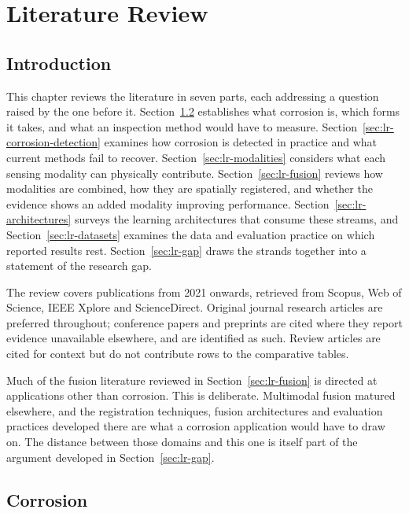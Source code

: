 \chapter[LITERATURE REVIEW]{Literature Review}
\label{ch:literature-review}

\section{Introduction}
\label{sec:lr-introduction}

This chapter reviews the literature in seven parts, each addressing a question
raised by the one before it. Section~\ref{sec:lr-corrosion} establishes what
corrosion is, which forms it takes, and what an inspection method would have to
measure. Section~\ref{sec:lr-corrosion-detection} examines how corrosion is
detected in practice and what current methods fail to recover.
Section~\ref{sec:lr-modalities} considers what each sensing modality can
physically contribute. Section~\ref{sec:lr-fusion} reviews how modalities are
combined, how they are spatially registered, and whether the evidence shows an
added modality improving performance. Section~\ref{sec:lr-architectures} surveys
the learning architectures that consume these streams, and
Section~\ref{sec:lr-datasets} examines the data and evaluation practice on which
reported results rest. Section~\ref{sec:lr-gap} draws the strands together into
a statement of the research gap.

The review covers publications from 2021 onwards, retrieved from Scopus, Web of
Science, IEEE Xplore and ScienceDirect. Original journal research articles are
preferred throughout; conference papers and preprints are cited where they
report evidence unavailable elsewhere, and are identified as such. Review
articles are cited for context but do not contribute rows to the comparative
tables.

Much of the fusion literature reviewed in Section~\ref{sec:lr-fusion} is
directed at applications other than corrosion. This is deliberate. Multimodal
fusion matured elsewhere, and the registration techniques, fusion architectures
and evaluation practices developed there are what a corrosion application would
have to draw on. The distance between those
domains and this one is itself part of the argument developed in
Section~\ref{sec:lr-gap}.

\section{Corrosion}
\label{sec:lr-corrosion}

